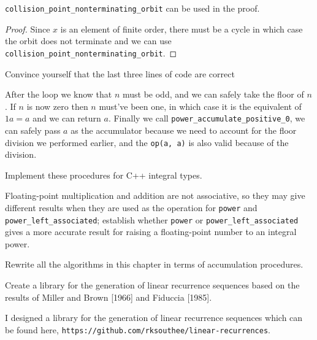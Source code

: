 \begin{lemma}
	\verb|collision_point_nonterminating_orbit| can be used in the proof.
\end{lemma}

\begin{proof}
	Since $x$ is an element of finite order, there must be a cycle in which case the orbit
	does not terminate and we can use \verb|collision_point_nonterminating_orbit|.
\end{proof}

\begin{exercise}
	Convince yourself that the last three lines of code are correct
\end{exercise}

\begin{solution}
	After the loop we know that $n$ must be odd, and we can safely take the
	floor of $n$. If $n$ is now zero then $n$ must've been one, in which case it is the
	equivalent of $1a = a$ and we can return $a$. Finally we call \verb|power_accumulate_positive_0|,
	we can safely pass $a$ as the accumulator because we need to account for the floor division
	we performed earlier, and the \verb|op(a, a)| is also valid because of the division.
\end{solution}

\begin{exercise}
	Implement these procedures for C++ integral types.
\end{exercise}



\begin{project}
	Floating-point multiplication and addition are not associative, so they may give different
	results when they are used as the operation for \verb|power| and \verb|power_left_associated|;
	establish whether \verb|power| or \verb|power_left_associated| gives a more accurate result
	for raising a floating-point number to an integral power.
\end{project}

\begin{exercise}
	Rewrite all the algorithms in this chapter in terms of accumulation procedures.
\end{exercise}

\begin{project}
	Create a library for the generation of linear recurrence sequences based on the results
	of Miller and Brown [1966] and Fiduccia [1985].
\end{project}

\begin{solution}
	I designed a library for the generation of linear recurrence sequences which can be
	found here, \verb|https://github.com/rksouthee/linear-recurrences|.
\end{solution}

